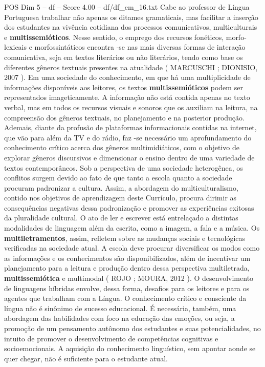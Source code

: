 \begin{textsample}{POS Dim 5 – df – Score 4.00 – df/df\_em\_16.txt}
Cabe ao professor de Língua Portuguesa trabalhar não apenas os ditames gramaticais, mas facilitar a inserção dos estudantes na vivência cotidiana dos processos comunicativos, multiculturais e \textbf{multissemióticos}.
Nesse sentido, o emprego dos recursos fonéticos, morfo-lexicais e morfossintáticos encontra -se nas mais diversas formas de interação comunicativa, seja em textos literários ou não literários, tendo como base os diferentes gêneros textuais presentes na atualidade ( MARCUSCHI ; DIONISIO, 2007 ).
Em uma sociedade do conhecimento, em que há uma multiplicidade de informações disponíveis aos leitores, os textos \textbf{multissemióticos} podem ser representados imageticamente.
A informação não está contida apenas no texto verbal, mas em todos os recursos visuais e sonoros que os auxiliam na leitura, na compreensão dos gêneros textuais, no planejamento e na posterior produção.
Ademais, diante da profusão de plataformas informacionais contidas na internet, que vão para além da TV e do rádio, faz -se necessário um aprofundamento do conhecimento crítico acerca dos gêneros multimidiáticos, com o objetivo de explorar gêneros discursivos e dimensionar o ensino dentro de uma variedade de textos contemporâneos.
Sob a perspectiva de uma sociedade heterogênea, os conflitos surgem devido ao fato de que tanto a escola quanto a sociedade procuram padronizar a cultura.
Assim, a abordagem do multiculturalismo, contido nos objetivos de aprendizagem deste Currículo, procura dirimir as consequências negativas dessa padronização e promover as experiências exitosas da pluralidade cultural.
O ato de ler e escrever está entrelaçado a distintas modalidades de linguagem além da escrita, como a imagem, a fala e a música.
Os \textbf{multiletramentos}, assim, refletem sobre as mudanças sociais e tecnológicas verificadas na sociedade atual.
A escola deve procurar diversificar os modos como as informações e os conhecimentos são disponibilizados, além de incentivar um planejamento para a leitura e produção dentro dessa perspectiva multiletrada, \textbf{multissemiótica} e multimodal ( ROJO ; MOURA, 2012 ).
O desenvolvimento de linguagens híbridas envolve, dessa forma, desafios para os leitores e para os agentes que trabalham com a Língua.
O conhecimento crítico e consciente da língua não é sinônimo de sucesso educacional.
É necessária, também, uma abordagem das habilidades com foco na educação das emoções, ou seja, a promoção de um pensamento autônomo dos estudantes e suas potencialidades, no intuito de promover o desenvolvimento de competências cognitivas e socioemocionais.
A aquisição do conhecimento linguístico, sem apontar aonde se quer chegar, não é suficiente para o estudante atual.

\end{textsample}
